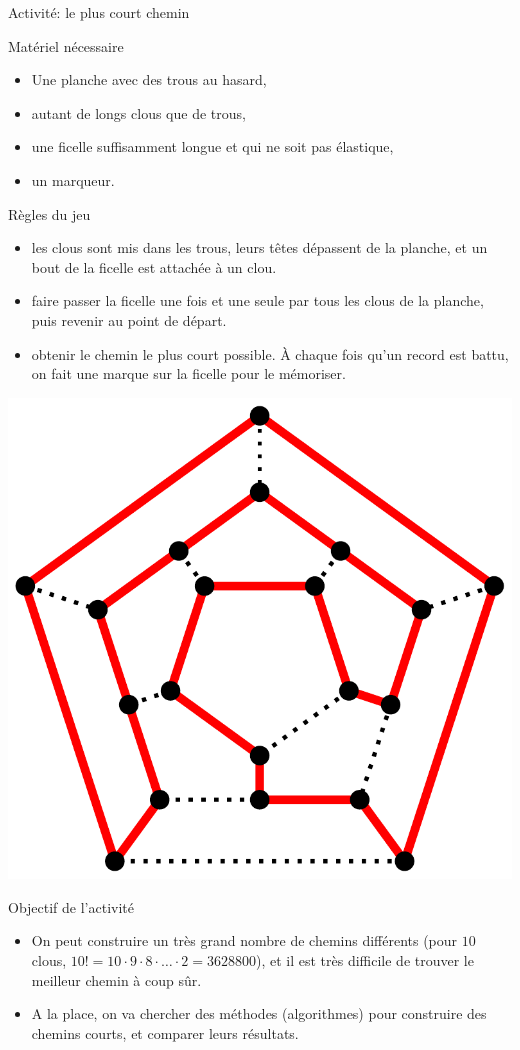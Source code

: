 \begin{frame}{Activité: le plus court chemin}
  
  \begin{block}{Matériel nécessaire}
    \begin{itemize}
    \item Une planche avec des trous au hasard,
    \item autant de longs clous que de trous,
    \item une ficelle suffisamment longue et \alert{qui ne soit pas élastique},
    \item un marqueur.
    \end{itemize}
  \end{block}

  \begin{block}{Règles du jeu}
    \begin{itemize}
    \item {} les clous sont mis dans les trous, leurs têtes dépassent de la planche, et un bout de la ficelle est attachée à un clou.
    \item {} faire passer la ficelle \alert{une fois et une seule} par \alert{tous les clous} de la planche, puis revenir au point de départ.
    \item  {} obtenir le chemin le plus court possible. À chaque fois qu'un record est battu, on fait une marque sur la ficelle pour le mémoriser.
    \end{itemize}
  \end{block}

  \begin{center}
    \includegraphics[width=0.3\linewidth]{img/Hamiltonian_path.pdf}
  \end{center}

  \begin{block}{Objectif de l'activité}
    \begin{itemize}
    \item On peut construire un très grand nombre de chemins différents (pour $10$ clous, $10! = 10 \cdot 9 \cdot 8 \cdot \ldots \cdot 2 = 3628800$), et il est très difficile de trouver le meilleur chemin à coup sûr.
    \item A la place, on va chercher des méthodes (algorithmes) pour construire des chemins courts, et comparer leurs résultats.
    \end{itemize}
  \end{block}

\end{frame}

